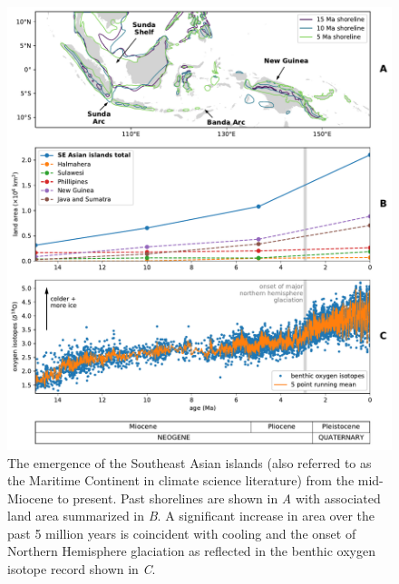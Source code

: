 \documentclass[9pt,twocolumn,twoside,lineno]{pnas-new}
\begin{document}
\begin{figure}[h]
    \centering
    \includegraphics[width=11.4cm]{Figures/shoreline_growth.pdf}
    \caption{The emergence of the Southeast Asian islands (also referred to as the Maritime Continent in climate science literature) from the mid-Miocene to present. Past shorelines are shown in \textit{A} with associated land area summarized in \textit{B}. A significant increase in area over the past 5 million years is coincident with cooling and the onset of Northern Hemisphere glaciation as reflected in the benthic oxygen isotope record \cite{Zachos2008a} shown in \textit{C}.}
    \label{fig:shoreline_growth}
\end{figure}
\end{document}
